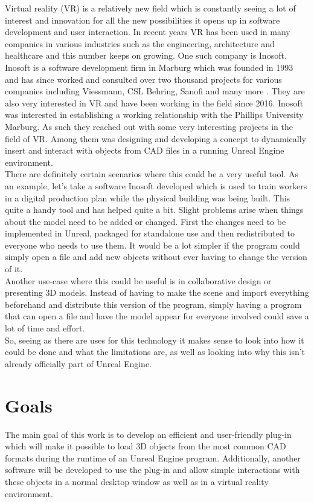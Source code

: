 Virtual reality (\acs{VR}) is a relatively new field which is constantly seeing a lot of interest and innovation for all the new possibilities it opens up in software development and user interaction. In recent years \acs{VR} has been used in many companies in various industries such as the engineering, architecture and healthcare and this number keeps on growing\cite{bib:VRFields}. One such company is Inosoft.\\
Inosoft is a software development firm in Marburg which was founded in 1993 and has since worked and consulted over two thousand projects for various companies including Viessmann, CSL Behring, Sanofi and many more \cite{bib:InosoftAbout}. They are also very interested in \acs{VR} and have been working in the field since 2016. Inosoft was interested in establishing a working relationship with the Phillips University Marburg. As such they reached out with some very interesting projects in the field of \acs{VR}. Among them was designing and developing a concept to dynamically insert and interact with objects from \acs{CAD} files in a running Unreal Engine environment.\\
There are definitely certain scenarios where this could be a very useful tool. As an example, let's take a software Inosoft developed which is used to train workers in a digital production plan while the physical building was being built. This quite a handy tool and has helped quite a bit\cite{bib:InosoftProject}. Slight problems arise when things about the model need to be added or changed. First the changes need to be implemented in Unreal, packaged for standalone use and then redistributed to everyone who needs to use them. It would be a lot simpler if the program could simply open a file and add new objects without ever having to change the version of it.\\
Another use-case where this could be useful is in collaborative design or presenting 3D models. Instead of having to make the scene and import everything beforehand and distribute this version of the program, simply having a program that can open a file and have the model appear for everyone involved could save a lot of time and effort.\\
So, seeing as there are uses for this technology it makes sense to look into how it could be done and what the limitations are, as well as looking into why this isn't already officially part of Unreal Engine.

\section{Goals}\label{chp:Goals}   
The main goal of this work is to develop an efficient and user-friendly plug-in which will make it possible to load 3D objects from the most common \acs{CAD} formats during the runtime of an Unreal Engine program. Additionally, another software will be developed to use the plug-in and allow simple interactions with these objects in a normal desktop window as well as in a virtual reality environment.

